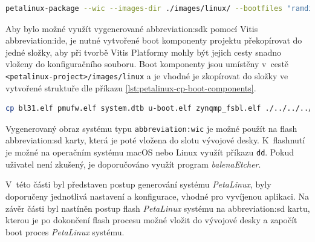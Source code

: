 \documentclass[a4paper, twoside, 11pt]{article}
\begin{document}
\begin{lstlisting}[language={sh}, caption={Příkaz pro vytvoření obrazu systému, který bude vvyužit v~procesu flash SD Card (vybalování obrazu systému na SD kartu).}, label= {lst:petalinux-package-wic}, morekeywords={petalinux-build, petalinux-package, petalinux-config}]
petalinux-package --wic --images-dir ./images/linux/ --bootfiles "ramdisk.cpio.gz.u-boot,boot.scr,Image,system.dtb,system-zynqmp-sck-kr-g-revB.dtb" --disk-name "sda"\end{lstlisting}

	Aby bylo možné využít vygenerované \gls{abbreviation:sdk} pomocí Vitis \gls{abbreviation:ide}, je nutné vytvořené boot komponenty projektu překopírovat do jedné složky, aby při tvorbě Vitis Platformy mohly být jejich cesty snadno vloženy do konfiguračního souboru. Boot komponenty jsou umístěny v~cestě\\\texttt{<petalinux-project>/images/linux} a je vhodné je zkopírovat do složky ve vytvořené struktuře dle příkazu \ref{lst:petalinux-cp-boot-components}.\par

	\begin{lstlisting}[language={sh}, caption={Příkaz pro kopírování boot komponent do složky dané strukturou projektu.}, label={lst:petalinux-cp-boot-components}, morekeywords={cp}]
cp bl31.elf pmufw.elf system.dtb u-boot.elf zynqmp_fsbl.elf ./../../../linux-files/pfm/boot/\end{lstlisting}

		Vygenerovaný obraz systému typu \texttt{\gls{abbreviation:wic}} je možné použít na flash \gls{abbreviation:sd} karty, která je poté vložena do slotu vývojové desky. K~flashnutí je možné na operačním systému macOS nebo Linux využít příkazu \texttt{dd}. Pokud uživatel není zkušený, je doporučováno využít program \textit{balenaEtcher}.\par
		V~této části byl představen postup generování systému \textit{PetaLinux}, byly doporučeny jednotlivá nastavení a konfigurace, vhodné pro vyvíjenou aplikaci. Na závěr části byl nastíněn postup flash \textit{PetaLinux} systému na \gls{abbreviation:sd} kartu, kterou je po dokončení flash procesu možné vložit do vývojové desky a započít boot proces \textit{PetaLinux} systému.
\end{document}
